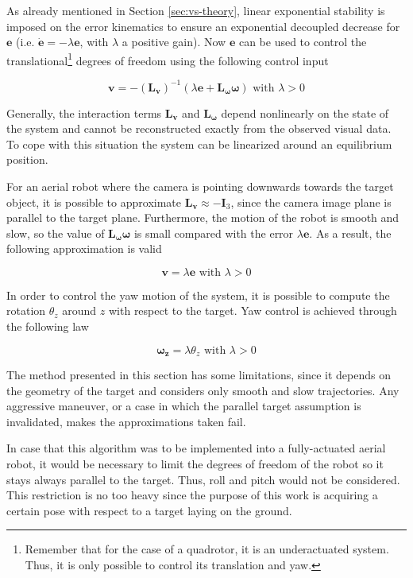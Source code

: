 As already mentioned in Section \ref{sec:vs-theory}, linear exponential stability is imposed on the error kinematics to ensure an exponential decoupled decrease for $\bm{e}$ (i.e. $\dot{\bm{e}} = - \lambda \bm{e}$, with $\lambda$ a positive gain). Now $\bm{e}$ can be used to control the translational\footnote{Remember that for the case of a quadrotor, it is an underactuated system. Thus, it is only possible to control its translation and yaw.} degrees of freedom using the following control input

\begin{equation}
\bm{v} = - (\bm{L_v})^{-1} (\lambda \bm{e} + \bm{L_\omega} \bm{\omega}) \text{ with } \lambda > 0
\end{equation}

Generally, the interaction terms $\bm{L_v}$ and $\bm{L_\omega}$ depend nonlinearly on the state of the system and cannot be reconstructed exactly from the observed visual data. To cope with this situation the system can be linearized around an equilibrium position.

For an aerial robot where the camera is pointing downwards towards the target object, it is possible to approximate $\bm{L_v} \approx - \bm{I}_3$, since the camera image plane is parallel to the target plane. Furthermore, the motion of the robot is smooth and slow, so the value of $\bm{L_\omega} \bm{\omega}$ is small compared with the error $\lambda \bm{e}$. As a result, the following approximation is valid

\begin{equation}
\bm{v} = \lambda \bm{e} \text{ with } \lambda > 0
\end{equation}

In order to control the yaw motion of the system, it is possible to compute the rotation $\theta_z$ around $z$ with respect to the target. Yaw control is achieved through the following law

\begin{equation}
\bm{\omega_z} = \lambda \theta_z \text{ with } \lambda > 0
\end{equation}

The method presented in this section has some limitations, since it depends on the geometry of the target and considers only smooth and slow trajectories. Any aggressive maneuver, or a case in which the parallel target assumption is invalidated, makes the approximations taken fail.

In case that this algorithm was to be implemented into a fully-actuated aerial robot, it would be necessary to limit the degrees of freedom of the robot so it stays always parallel to the target. Thus, roll and pitch would not be considered. This restriction is no too heavy since the purpose of this work is acquiring a certain pose with respect to a target laying on the ground. 

